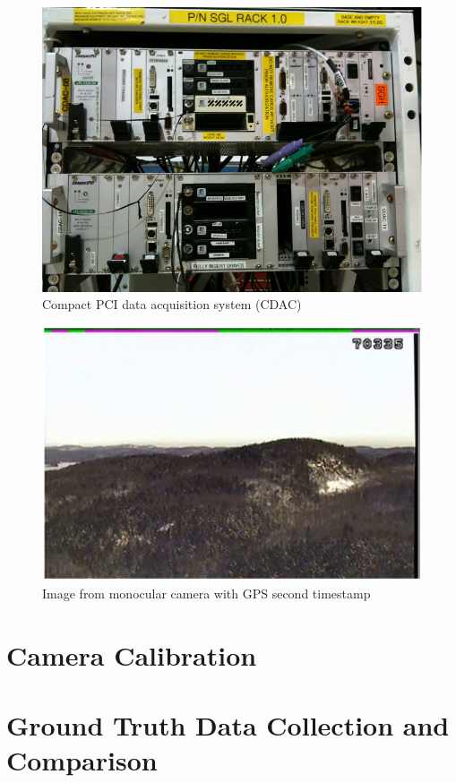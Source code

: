 \begin{figure}[h]
  \centering
  \includegraphics[width=12cm,keepaspectratio=true]{./Figures/CDAC_Rack.jpg}
  \caption{Compact PCI data acquisition system (CDAC)}
  \label{fig:CDAC}
\end{figure}

\begin{figure}[h]
  \centering
  \includegraphics[width=12cm,keepaspectratio=true]{./Figures/video_snapshot.jpg}
  \caption{Image from monocular camera with GPS second timestamp}
  \label{fig:video_snapshot}
\end{figure}

\section{Camera Calibration}
\section{Ground Truth Data Collection and Comparison}

